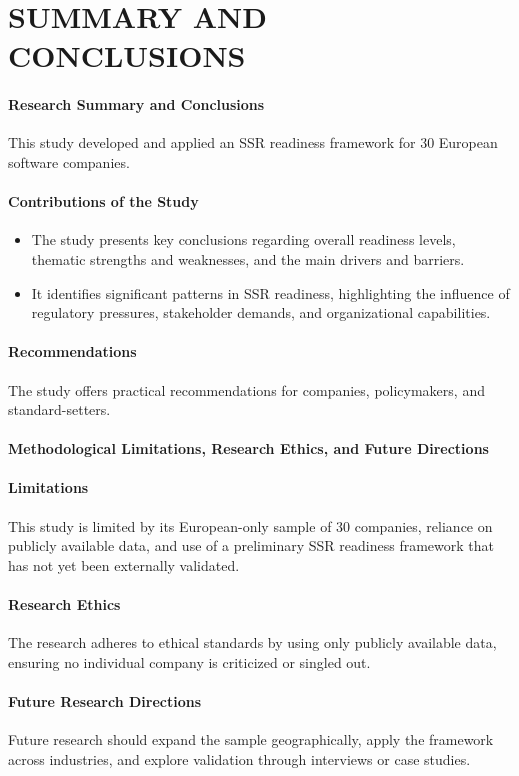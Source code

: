 \chapter{SUMMARY AND CONCLUSIONS}

\subsubsection{Research Summary and Conclusions}
This study developed and applied an SSR readiness framework for 30 European software companies.

\subsubsection{Contributions of the Study}

\begin{itemize}
    \item The study presents key conclusions regarding overall readiness levels, 
    thematic strengths and weaknesses, and the main drivers and barriers.
    \item It identifies significant patterns in SSR readiness, highlighting 
    the influence of regulatory pressures, stakeholder demands, and organizational capabilities.
\end{itemize}


\subsubsection{Recommendations}
The study offers practical recommendations for companies, policymakers, and standard-setters.

\subsubsection{Methodological Limitations, Research Ethics, and Future Directions}
\subsubsection{Limitations}
This study is limited by its European-only sample of 30 companies, reliance on publicly available data, 
and use of a preliminary SSR readiness framework that has not yet been externally validated.

\subsubsection{Research Ethics}
The research adheres to ethical standards by using only publicly available data, 
ensuring no individual company is criticized or singled out.

\subsubsection{Future Research Directions}
Future research should expand the sample geographically, apply the framework across industries, 
and explore validation through interviews or case studies.